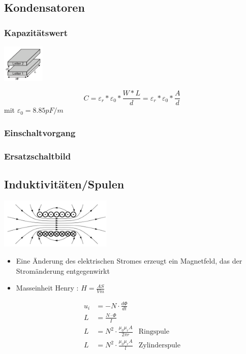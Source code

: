 \subsection{Kondensatoren}
\subsubsection{Kapazitätswert}
\begin{multicols}{2}
	\begin{center}
		\includegraphics[width=0.15\textwidth]{pictures/kapazitaetswert}
	\end{center}
	\columnbreak

	\begin{equation*}
		C=\varepsilon_{r}*\varepsilon_{0}*\frac{W*L}{d}=\varepsilon_{r}*\varepsilon_{0}*\frac{A}{d}
	\end{equation*}
	mit $\varepsilon_{0}= 8.85 pF/m$
\end{multicols}


\subsubsection{Einschaltvorgang}


\subsubsection{Ersatzschaltbild}


\subsection{Induktivitäten/Spulen}
\begin{multicols}{2}
	\includegraphics[width=0.4\textwidth]{pictures/induktivitaet}
	\columnbreak
	\begin{itemize}
  		\item Eine Änderung des elektrischen Stromes erzeugt ein Magnetfeld, das der
  			Stromänderung entgegenwirkt
  		\item Masseinheit Henry : $H=\frac{AS}{Vm}$
	\end{itemize}
	\begin{align*}
  		u_{i} &=-N\cdot\frac{d\Phi}{dt}\\
  		L &=\frac{N\cdot\Phi}{I} \\
  		L &=N^2\cdot\frac{\mu_{0}\mu_{r}A}{2\pi r} & \text{Ringspule} \\
  		L &=N^2\cdot\frac{\mu_{0}\mu_{r}A}{l} & \text{Zylinderspule}
	\end{align*}
\end{multicols}



